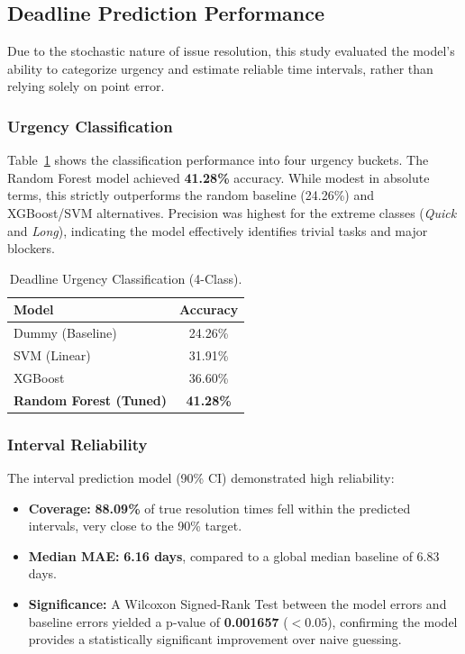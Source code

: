 \documentclass[conference]{IEEEtran}
\begin{document}
\subsection{Deadline Prediction Performance}

Due to the stochastic nature of issue resolution, this study evaluated the model's ability to categorize urgency and estimate reliable time intervals, rather than relying solely on point error.

\subsubsection{Urgency Classification}
Table~\ref{tab:deadline_class} shows the classification performance into four urgency buckets. The Random Forest model achieved \textbf{41.28\%} accuracy. While modest in absolute terms, this strictly outperforms the random baseline (24.26\%) and XGBoost/SVM alternatives. Precision was highest for the extreme classes (\textit{Quick} and \textit{Long}), indicating the model effectively identifies trivial tasks and major blockers.

\begin{table}[t]
\centering
\caption{Deadline Urgency Classification (4-Class).}
\renewcommand{\arraystretch}{1.08}
\begin{tabular}{l c}
\hline
\textbf{Model} & \textbf{Accuracy} \\
\hline
Dummy (Baseline) & 24.26\% \\
SVM (Linear) & 31.91\% \\
XGBoost & 36.60\% \\
\textbf{Random Forest (Tuned)} & \textbf{41.28\%} \\
\hline
\end{tabular}
\label{tab:deadline_class}
\end{table}

\subsubsection{Interval Reliability}
The interval prediction model (90\% CI) demonstrated high reliability:
\begin{itemize}
    \item \textbf{Coverage:} \textbf{88.09\%} of true resolution times fell within the predicted intervals, very close to the 90\% target.
    \item \textbf{Median MAE:} \textbf{6.16 days}, compared to a global median baseline of 6.83 days.
    \item \textbf{Significance:} A Wilcoxon Signed-Rank Test between the model errors and baseline errors yielded a p-value of \textbf{0.001657} ($<0.05$), confirming the model provides a statistically significant improvement over naive guessing.
\end{itemize}
\end{document}
